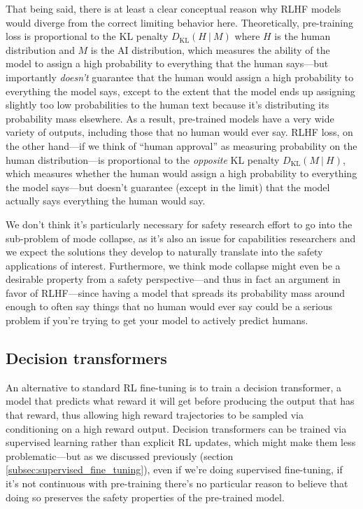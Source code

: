 \documentclass[
  onecolumn,
  natbib,
]{miri-tech-article}
\begin{document}
That being said, there is at least a clear conceptual reason why RLHF models would diverge from the correct limiting behavior here. Theoretically, pre-training loss\cite{cross_entropy} is proportional to the KL penalty\cite{kl_divergence} $D_\text{KL}(H ~|~ M)$ where $H$ is the human distribution and $M$ is the AI distribution, which measures the ability of the model to assign a high probability to everything that the human says---but importantly \textit{doesn't} guarantee that the human would assign a high probability to everything the model says, except to the extent that the model ends up assigning slightly too low probabilities to the human text because it's distributing its probability mass elsewhere. As a result, pre-trained models have a very wide variety of outputs, including those that no human would ever say. RLHF loss, on the other hand---if we think of ``human approval'' as measuring probability on the human distribution---is proportional to the \textit{opposite} KL penalty $D_\text{KL}(M ~|~ H)$, which measures whether the human would assign a high probability to everything the model says---but doesn't guarantee (except in the limit) that the model actually says everything the human would say.

We don't think it's particularly necessary for safety research effort to go into the sub-problem of mode collapse, as it's also an issue for capabilities researchers and we expect the solutions they develop to naturally translate into the safety applications of interest. Furthermore, we think mode collapse might even be a desirable property from a safety perspective---and thus in fact an argument in favor of RLHF---since having a model that spreads its probability mass around enough to often say things that no human would ever say could be a serious problem if you're trying to get your model to actively predict humans.


\subsection{Decision transformers}

An alternative to standard RL fine-tuning is to train a decision transformer\cite{chen_decision_2021}, a model that predicts what reward it will get before producing the output that has that reward, thus allowing high reward trajectories to be sampled via conditioning on a high reward output. Decision transformers can be trained via supervised learning rather than explicit RL updates, which might make them less problematic---but as we discussed previously (section \ref{subsec:supervised_fine_tuning}), even if we're doing supervised fine-tuning, if it's not continuous with pre-training there's no particular reason to believe that doing so preserves the safety properties of the pre-trained model.
\end{document}
